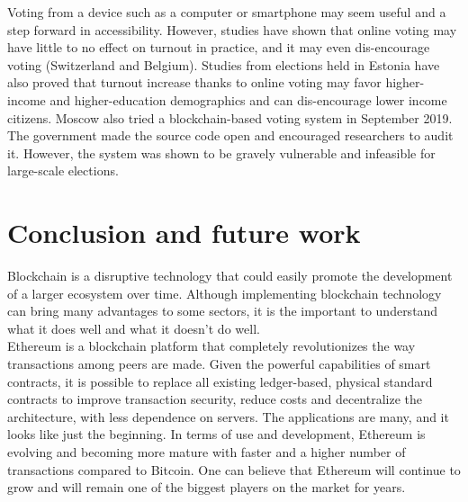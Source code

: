 \documentclass[10pt]{article}
\begin{document}
\begin{multicols}{2}
Voting from a device such as a computer or smartphone may seem useful and a step forward in accessibility. However, studies have shown\cite{ref:park} that online voting may have little to no effect on turnout in practice, and it may even dis-encourage voting (Switzerland and Belgium). Studies from elections held in Estonia have also proved that turnout increase thanks to online voting may favor higher-income and higher-education demographics and can dis-encourage lower income citizens. Moscow also tried a blockchain-based voting system in September 2019. The government made the source code open and encouraged researchers to audit it. However, the system was shown to be gravely vulnerable and infeasible for large-scale elections.


\section{Conclusion and future work}

Blockchain is a disruptive technology that could easily promote the development of a larger ecosystem over time. Although implementing blockchain technology can bring many advantages to some sectors, it is the important to understand what it does well and what it doesn't do well.\\

Ethereum is a blockchain platform that completely revolutionizes the way transactions among peers are made. Given the powerful capabilities of smart contracts, it is possible to replace all existing ledger-based, physical standard contracts to improve transaction security, reduce costs and decentralize the architecture, with less dependence on servers. The applications are many, and it looks like just the beginning. In terms of use and development, Ethereum is evolving and becoming more mature with faster and a higher number of transactions compared to Bitcoin. One can believe that Ethereum will continue to grow and will remain one of the biggest players on the market for years.\\


\end{multicols}
\end{document}
